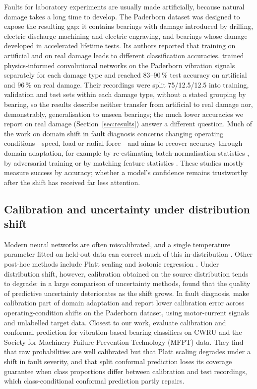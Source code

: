 Faults for laboratory experiments are usually made artificially, because natural damage takes a long time to develop. The
Paderborn dataset \citep{lessmeier2016} was designed to expose the resulting gap: it contains bearings with damage
introduced by drilling, electric discharge machining and electric engraving, and bearings whose damage developed in
accelerated lifetime tests. Its authors reported that training on artificial and on real damage leads to different
classification accuracies. \citet{hassannejad2025} trained physics-informed convolutional networks on the
Paderborn vibration signals separately for each damage type and reached 83--90\,\% test accuracy on artificial and
96\,\% on real damage. Their recordings were split 75/12.5/12.5 into training, validation and test sets within each
damage type, without a stated grouping by bearing, so the results describe neither transfer from artificial to real
damage nor, demonstrably, generalisation to unseen bearings; the much lower accuracies we report on real damage
(Section~\ref{sec:results}) answer a different question. Much of the work on domain shift in fault diagnosis
concerns changing operating conditions---speed, load or radial force---and aims to recover accuracy through domain
adaptation, for example by re-estimating batch-normalisation statistics \citep{li2018,zhang2017}, by adversarial
training \citep{ganin2016} or by matching feature statistics \citep{sun2016}. These studies mostly measure success by
accuracy; whether a model's confidence remains trustworthy after the shift has received far less attention.

\subsection{Calibration and uncertainty under distribution shift}

Modern neural networks are often miscalibrated, and a single temperature parameter fitted on held-out data can correct
much of this in-distribution \citep{guo2017}. Other post-hoc methods include Platt scaling \citep{platt1999} and
isotonic regression \citep{zadrozny2002}. Under distribution shift, however, calibration obtained on the source
distribution tends to degrade: in a large comparison of uncertainty methods, \citet{ovadia2019} found that the quality
of predictive uncertainty deteriorates as the shift grows. In fault diagnosis, \citet{forest2024} make calibration
part of domain adaptation and report lower calibration error across operating-condition shifts on the Paderborn
dataset, using motor-current signals and unlabelled target data. Closest to our work, \citet{gonzalezgarcia2026}
evaluate calibration and conformal prediction for vibration-based bearing classifiers on CWRU and the Society for Machinery Failure Prevention Technology (MFPT) data. They find that
raw probabilities are well calibrated but that Platt scaling degrades under a shift in fault severity, and that split
conformal prediction loses its coverage guarantee when class proportions differ between calibration and test
recordings, which class-conditional conformal prediction partly repairs.

